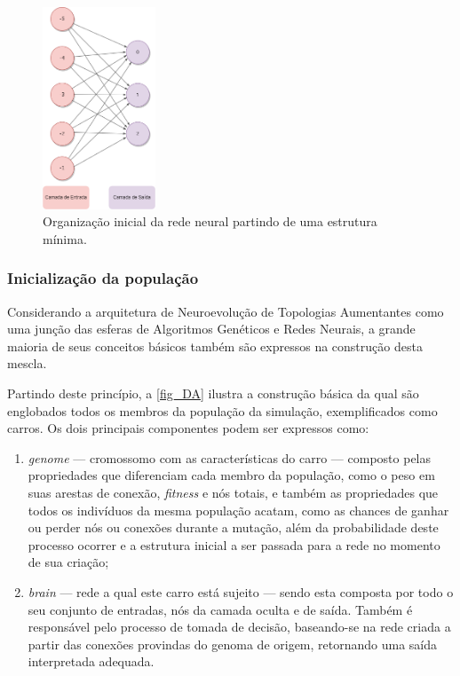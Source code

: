 \begin{figure}[htb]
        \centering
        \caption{\label{fig_CC}Organização inicial da rede neural partindo de uma estrutura mínima.}
        \includegraphics[width=0.3\textwidth]{images/CC.png}
\end{figure}

\subsubsection{Inicialização da população}
Considerando a arquitetura de Neuroevolução de Topologias Aumentantes como uma junção das esferas de Algoritmos
Genéticos e Redes Neurais, a grande maioria de seus conceitos básicos também são expressos na construção desta mescla.

Partindo deste princípio, a \autoref{fig_DA} ilustra a construção básica da qual são englobados todos os membros
da população da simulação, exemplificados como carros. Os dois principais componentes podem ser expressos como:

\begin{enumerate}
	\item \textit{genome} — cromossomo com as características do carro — composto pelas propriedades que diferenciam cada membro da população, como o peso em suas arestas de conexão, \textit{fitness} e nós totais, e também as propriedades que todos os indivíduos da mesma população acatam, como as chances de ganhar ou perder nós ou conexões durante a mutação, além da probabilidade deste processo ocorrer e a estrutura inicial a ser passada para a rede no momento de sua criação; 
	\item \textit{brain} —  rede a qual este carro está sujeito — sendo esta composta por todo o seu conjunto de entradas, nós da camada oculta e de saída. Também é responsável pelo processo de tomada de decisão, baseando-se na rede criada a partir das conexões provindas do genoma de origem, retornando uma saída interpretada adequada.
\end{enumerate}


